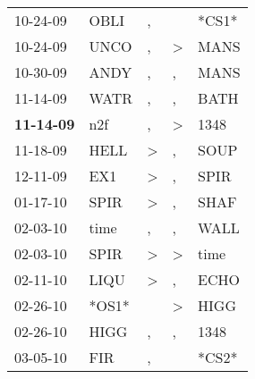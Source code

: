 \begin{supertabular}{p{0.07\textwidth}p{0.06\textwidth}p{0.02\textwidth}p{0.02\textwidth}p{0.06\textwidth}}
          10-24-09\textsuperscript{} &           OBLI\textsuperscript{} &                , &                  &                            *CS1* \\
          10-24-09\textsuperscript{} &           UNCO\textsuperscript{} &                , &     \textgreater &           MANS\textsuperscript{} \\
          10-30-09\textsuperscript{} &           ANDY\textsuperscript{} &                , &                , &           MANS\textsuperscript{} \\
          11-14-09\textsuperscript{} &           WATR\textsuperscript{} &                , &                , &           BATH\textsuperscript{} \\
 \textbf{11-14-09\textsuperscript{}} &            n2f\textsuperscript{} &                , &     \textgreater &           1348\textsuperscript{} \\
          11-18-09\textsuperscript{} &           HELL\textsuperscript{} &     \textgreater &                , &           SOUP\textsuperscript{} \\
          12-11-09\textsuperscript{} &            EX1\textsuperscript{} &     \textgreater &                , &           SPIR\textsuperscript{} \\
          01-17-10\textsuperscript{} &           SPIR\textsuperscript{} &     \textgreater &                , &           SHAF\textsuperscript{} \\
          02-03-10\textsuperscript{} &           time\textsuperscript{} &                , &                , &           WALL\textsuperscript{} \\
          02-03-10\textsuperscript{} &           SPIR\textsuperscript{} &     \textgreater &     \textgreater &           time\textsuperscript{} \\
          02-11-10\textsuperscript{} &           LIQU\textsuperscript{} &     \textgreater &                , &           ECHO\textsuperscript{} \\
          02-26-10\textsuperscript{} &                            *OS1* &                  &     \textgreater &           HIGG\textsuperscript{} \\
          02-26-10\textsuperscript{} &           HIGG\textsuperscript{} &                , &                , &           1348\textsuperscript{} \\
          03-05-10\textsuperscript{} &            FIR\textsuperscript{} &                , &                  &                            *CS2* \\

\end{supertabular}
